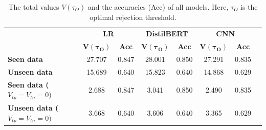 \begin{table}
    \scriptsize
    \centering
    \begin{tabular}{lccccccc}
        \toprule
                                                 & \multicolumn{2}{c}{\textbf{LR}} & \multicolumn{2}{c}{\textbf{DistilBERT}} & \multicolumn{2}{c}{\textbf{CNN}}                                                          \\
        \cmidrule(l){2-3} \cmidrule(l){4-5} \cmidrule(l){6-7}
                                                 & $\boldsymbol{V(\tau_O)}$        & \textbf{Acc}                            & $\boldsymbol{V(\tau_O)}$         & \textbf{Acc} & $\boldsymbol{V(\tau_O)}$ & \textbf{Acc} \\
        \midrule
        \textbf{Seen data}                       & 27.707                          & 0.847                                   & 28.001                           & 0.850        & 27.291                   & 0.835        \\
        \textbf{Unseen data}                     & 15.689                          & 0.640                                   & 15.823                           & 0.640        & 14.868                   & 0.629        \\
        \midrule
        \textbf{Seen data ($V_{tp}=V_{tn}=0)$}   & 2.688                           & 0.847                                   & 3.041                            & 0.850        & 2.490                    & 0.835        \\
        \textbf{Unseen data ($V_{tp}=V_{tn}=0)$} & 3.668                           & 0.640                                   & 3.606                            & 0.640        & 3.365                    & 0.629        \\
        \bottomrule
    \end{tabular}
    \caption{The total values $V(\tau_O)$ and the accuracies (Acc) of all models. Here, $\tau_O$ is the optimal rejection threshold.}
    \label{tab:metric2}
\end{table}